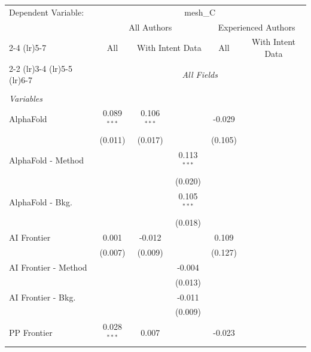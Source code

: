 \begingroup
\centering
\begin{tabular}{lcccccc}
   \tabularnewline \midrule \midrule
   Dependent Variable: & \multicolumn{6}{c}{mesh\_C}\\
 & \multicolumn{3}{c}{All Authors} & \multicolumn{3}{c}{Experienced Authors} \\
\cmidrule(lr){2-4} \cmidrule(lr){5-7}
 & \multicolumn{1}{c}{All} & \multicolumn{2}{c}{With Intent Data} & \multicolumn{1}{c}{All} & \multicolumn{2}{c}{With Intent Data} \\
\cmidrule(lr){2-2} \cmidrule(lr){3-4} \cmidrule(lr){5-5} \cmidrule(lr){6-7}
 & \multicolumn{6}{c}{\textit{All Fields}} \\ \\
   \emph{Variables}\\
   AlphaFold            & 0.089$^{***}$ & 0.106$^{***}$ &               & -0.029       &        &   \\   
                        & (0.011)       & (0.017)       &               & (0.105)      &        &   \\   
   AlphaFold - Method   &               &               & 0.113$^{***}$ &              &        &   \\   
                        &               &               & (0.020)       &              &        &   \\   
   AlphaFold - Bkg.     &               &               & 0.105$^{***}$ &              &        &   \\   
                        &               &               & (0.018)       &              &        &   \\   
   AI Frontier          & 0.001         & -0.012        &               & 0.109        &        &   \\   
                        & (0.007)       & (0.009)       &               & (0.127)      &        &   \\   
   AI Frontier - Method &               &               & -0.004        &              &        &   \\   
                        &               &               & (0.013)       &              &        &   \\   
   AI Frontier - Bkg.   &               &               & -0.011        &              &        &   \\   
                        &               &               & (0.009)       &              &        &   \\   
   PP Frontier          & 0.028$^{***}$ & 0.007         &               & -0.023       &        &   \\   

\end{tabular}
